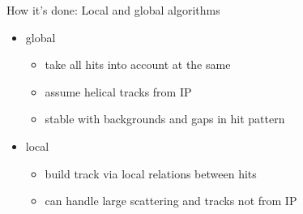 \documentclass[presentation]{etp-beamer-fancy}
\begin{document}
\begin{frame}[label={sec:org6c5dc2d}]{How it's done: Local and global algorithms}
\begin{itemize}
\item global
\begin{itemize}
\item take all hits into account at the same
\item assume helical tracks from IP
\item stable with backgrounds and gaps in hit pattern
\end{itemize}
\item local
\begin{itemize}
\item build track via local relations between hits
\item can handle large scattering and tracks not from IP
\end{itemize}
\end{itemize}
\end{frame}
\end{document}
